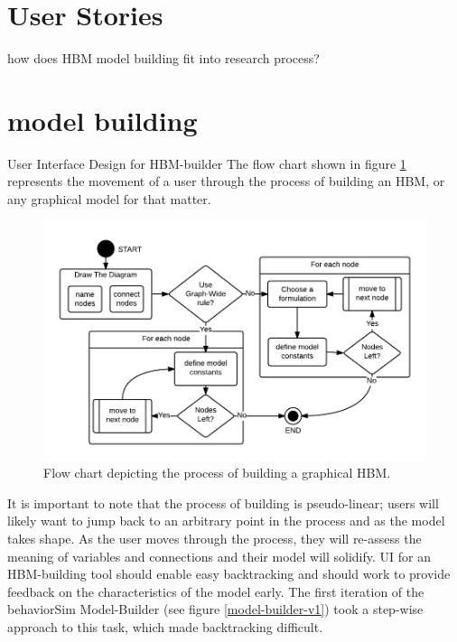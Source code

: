 \section{User Stories}
how does HBM model building fit into research process?

\section{model building}
User Interface Design for HBM-builder 
The flow chart shown in figure \ref{HBM-build-process} represents the movement of a user through the process of building an HBM, or any graphical model for that matter.

\begin{figure}[!t]
  \centering
  \includegraphics[width=0.9\columnwidth]{img/HBM-build-process}
  \caption{Flow chart depicting the process of building a graphical HBM.}
  \label{HBM-build-process}
\end{figure}

It is important to note that the process of building is pseudo-linear; users will likely want to jump back to an arbitrary point in the process and as the model takes shape. 
As the user moves through the process, they will re-assess the meaning of variables and connections and their model will solidify. 
UI for an HBM-building tool should enable easy backtracking and should work to provide feedback on the characteristics of the model early. 
The first iteration of the behaviorSim Model-Builder (see figure \ref{model-builder-v1}) took a step-wise approach to this task, which made backtracking difficult.

